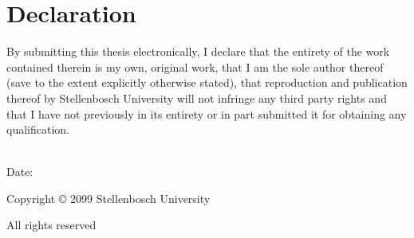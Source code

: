 \thispagestyle{plain}


\chapter*{Declaration}


By submitting this thesis electronically, I declare that the entirety of the work contained
therein is my own, original work, that I am the sole author thereof (save to the extent explicitly
otherwise stated), that reproduction and publication thereof by Stellenbosch University will
not infringe any third party rights and that I have not previously in its entirety or in part
submitted it for obtaining any qualification.


\vspace{35pt}

\noindent
\begin{minipage}{.5\textwidth}
    \noindent
    \phantom{Date:}~\hfill{}\hfill\mbox{}\\[-.5\baselineskip]
    Date:~ \dotfill\mbox{}\par
\end{minipage}

\vspace{35pt}

\vfill

    Copyright © 2099 Stellenbosch University\par
    All rights reserved

\vspace{35pt}

